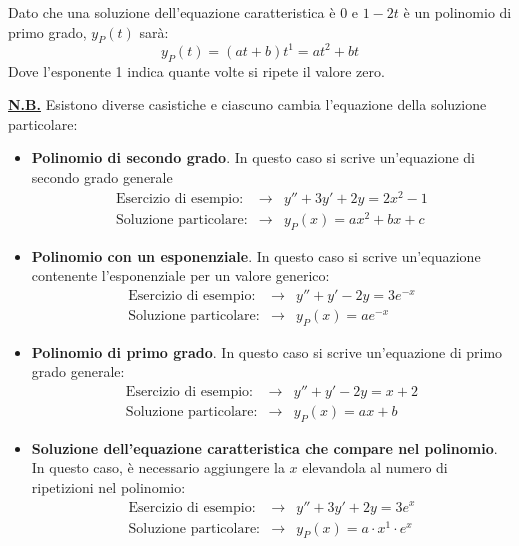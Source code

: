 \documentclass[a4paper]{article}
\begin{document}
	\noindent
	Dato che una soluzione dell'equazione caratteristica è $0$ e $1-2t$ è un polinomio di primo grado, $y_{P}\left(t\right)$ sarà:
	\begin{equation*}
		y_{P}\left(t\right) = \left(at + b\right)t^{1} = at^{2} + bt
	\end{equation*}
	Dove l'esponente 1 indica quante volte si ripete il valore zero.
	\begin{mdframed}
		\textbf{\underline{N.B.}} Esistono diverse casistiche e ciascuno cambia l'equazione della soluzione particolare:
		\begin{itemize}
			\item \textbf{Polinomio di secondo grado}. In questo caso si scrive un'equazione di secondo grado generale
			\begin{equation*}
				\begin{array}{rcl}
					\text{Esercizio di esempio:} &\longrightarrow& y''+3y'+2y = 2x^{2} -1 \\ [1em]
					\text{Soluzione particolare:} &\longrightarrow& y_{P}\left(x\right) = ax^{2} + bx + c
				\end{array}
			\end{equation*}\newpage

			\item \textbf{Polinomio con un esponenziale}. In questo caso si scrive un'equazione contenente l'esponenziale per un valore generico:
			\begin{equation*}
				\begin{array}{rcl}
					\text{Esercizio di esempio:} &\longrightarrow& y''+y'-2y = 3e^{-x} \\ [1em]
					\text{Soluzione particolare:} &\longrightarrow& y_{P}\left(x\right) = ae^{-x}
				\end{array}
			\end{equation*}

			\item \textbf{Polinomio di primo grado}. In questo caso si scrive un'equazione di primo grado generale:
			\begin{equation*}
				\begin{array}{rcl}
					\text{Esercizio di esempio:} &\longrightarrow& y''+y'-2y = x+2 \\ [1em]
					\text{Soluzione particolare:} &\longrightarrow& y_{P}\left(x\right) = ax + b
				\end{array}
			\end{equation*}

			\item \textbf{Soluzione dell'equazione caratteristica che compare nel polinomio}. In questo caso, è necessario aggiungere la $x$ elevandola al numero di ripetizioni nel polinomio:
			\begin{equation*}
				\begin{array}{rcl}
					\text{Esercizio di esempio:} &\longrightarrow& y''+3y'+2y = 3e^{x} \\ [1em]
					\text{Soluzione particolare:} &\longrightarrow& y_{P}\left(x\right) = a \cdot x^{1} \cdot e^{x}
				\end{array}
			\end{equation*}
			

\end{itemize}
\end{mdframed}
\end{document}
